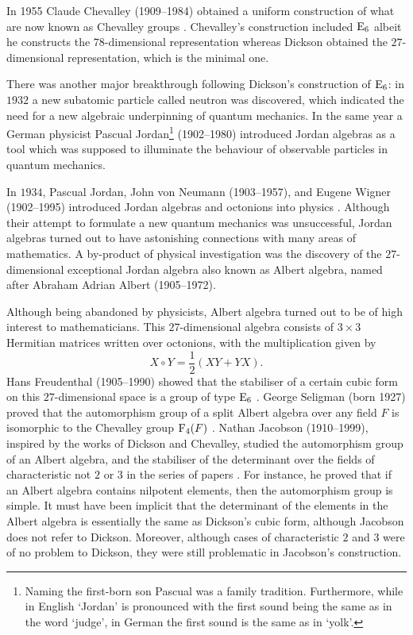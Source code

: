 In 1955 Claude Chevalley (1909--1984) obtained a uniform
construction of what are now known as Chevalley groups 
\cite{Chevalley}. Chevalley's construction included $\mathrm{E}_6$ albeit
he constructs the $78$-dimensional representation whereas
Dickson obtained the $27$-dimensional representation, which is
the minimal one. 

There was another major breakthrough following Dickson's 
construction of $\mathrm{E}_6$: in $1932$ a new subatomic particle called
neutron was discovered, which indicated the need for a new 
algebraic underpinning of quantum mechanics.
In the same year a German physicist 
Pascual Jordan\footnote{
Naming the first-born son Pascual was a family tradition. 
Furthermore, while in English `Jordan' is pronounced with the
first sound being the same as in the word `judge', in German
the first sound is the same as in `yolk'.
} (1902--1980) introduced Jordan algebras as a tool which was 
supposed to illuminate the behaviour of observable particles 
in quantum mechanics. 

In $1934$, Pascual Jordan, John von Neumann (1903--1957), 
and Eugene Wigner (1902--1995) introduced Jordan 
algebras and octonions into physics \cite{JordanNeumannWigner}. 
Although their attempt to formulate a new quantum mechanics was
unsuccessful, Jordan algebras turned out to have astonishing 
connections with many areas of mathematics. A by-product of
physical investigation was the discovery of the $27$-dimensional
exceptional Jordan algebra also known as Albert algebra, named 
after Abraham Adrian Albert (1905--1972).

Although being abandoned by physicists, Albert algebra turned out
to be of high interest to mathematicians. This $27$-dimensional
algebra consists of $3\times 3$ Hermitian matrices written 
over octonions, with the multiplication given by
\begin{equation}
X\circ Y = \frac12 (XY + YX).	
\end{equation}
Hans Freudenthal (1905--1990) showed that the stabiliser
of a certain cubic form on this $27$-dimensional space is a 
group of type $\mathrm{E}_6$ \cite{Freudenthal}. 
George Seligman (born 1927) proved that the 
automorphism group of a split Albert algebra over any field
$F$ is isomorphic to the Chevalley group $\mathrm{F}_4(F)$ 
\cite{Seligman}. Nathan Jacobson (1910--1999), 
inspired by the works of Dickson and
Chevalley, studied the automorphism 
group of an
Albert algebra, and the stabiliser of the determinant over the
fields of characteristic not $2$ or $3$ in the series of papers
\cite{JacobsonOne,JacobsonTwo,JacobsonThree}. For instance, he 
proved that if an Albert algebra contains nilpotent elements, 
then the automorphism group is simple. It must have been 
implicit that the
determinant of the elements in the Albert algebra is essentially
the same as Dickson's cubic form, although Jacobson does not refer
to Dickson. Moreover, although cases of characteristic $2$ and $3$
were of no problem to Dickson, they were still problematic in
Jacobson's construction.

